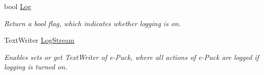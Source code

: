 \begin{DoxyCompactItemize}
bool \hyperlink{class_elib_1_1_epuck_a91d6eb45360b7338b65faa185f657f61}{Log}
\begin{DoxyCompactList}\small\item\em Return a {\ttfamily bool} flag, which indicates whether logging is on. \item\end{DoxyCompactList}\item 
TextWriter \hyperlink{class_elib_1_1_epuck_ac62091639e5474b54082b4c92d6f9fd5}{LogStream}
\begin{DoxyCompactList}\small\item\em Enables sets or get TextWriter of e-\/Puck, where all actions of e-\/Puck are logged if logging is turned on. \item\end{DoxyCompactList}\end{DoxyCompactItemize}
